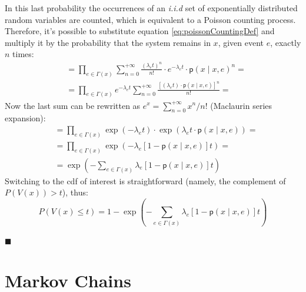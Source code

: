 \documentclass[12pt,a4paper]{article}
\newcommand*{\transp}{\mathsf{p}}
\begin{document}
\noindent
In this last probability the occurrences of an \textit{i.i.d} set of exponentially distributed random variables are counted, which is equivalent to a Poisson counting process. Therefore, it's possible to substitute equation \ref{eq:poissonCountingDef} and multiply it by the probability that the system remains in $x$, given event $e$, exactly $n$ times:
\begin{equation*}
\begin{split}
&=\prod_{e\in\Gamma(x)}\sum_{n=0}^{+\infty}
\frac{\left(\lambda_e t\right)^{n}}{n!} \cdot e^{-\lambda_e t} \cdot \transp\left( x \mid x,e\right)^{n} = \\
&=\prod_{e\in\Gamma(x)}e^{-\lambda_e t}\sum_{n=0}^{+\infty} \frac{\left[(\lambda_e t)\cdot \transp (x \mid x,e)\right]^n}{n!}
=
\end{split}
\end{equation*}
\noindent
Now the last sum can be rewritten as $e^x=\sum_{n=0}^{+\infty}x^n/n!$ (Maclaurin series expansion):
\begin{equation*}
\begin{split}
&=\prod_{e\in\Gamma(x)}\exp(-\lambda_e t) \cdot
\exp(\lambda_e t \cdot \transp\left(x \mid x,e\right))= \\
&=\prod_{e\in\Gamma(x)}\exp(-\lambda_e \left[1 - \transp(x \mid x,e)\right] t)= \\
&= \exp\left(- \sum_{e\in\Gamma(x)} \lambda_e \left[1 - \transp(x \mid x,e)\right] t\right)
\end{split}
\end{equation*}
\noindent
Switching to the cdf of interest is straightforward (namely, the complement of $P(V(x)) > t$), thus:
\begin{equation*}
P\left(V(x)\leq t\right)=1- \exp\left(- \sum_{e\in\Gamma(x)} \lambda_e \left[1 - \transp(x \mid x,e)\right] t\right)
\end{equation*}
\begin{flushright}
$\blacksquare$
\end{flushright}
\newpage
\section{Markov Chains}
\end{document}
